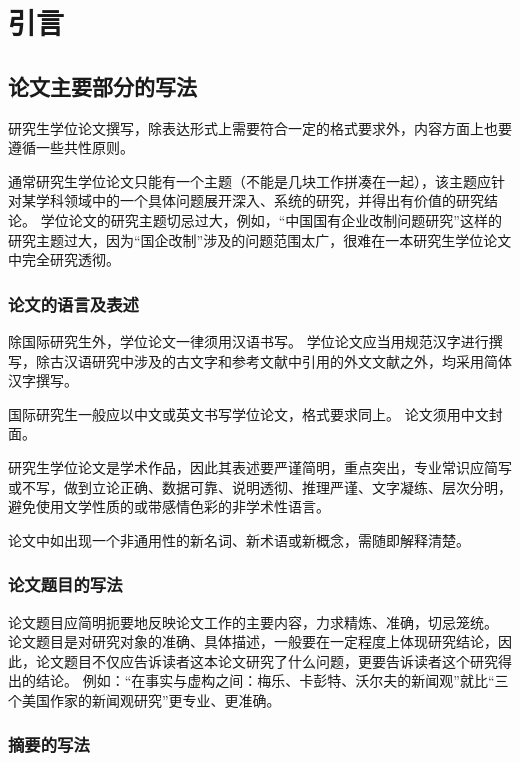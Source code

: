 \chapter{引言}
	\section{论文主要部分的写法}
	
	研究生学位论文撰写，除表达形式上需要符合一定的格式要求外，内容方面上也要遵循一些共性原则。
	
	通常研究生学位论文只能有一个主题（不能是几块工作拼凑在一起），该主题应针对某学科领域中的一个具体问题展开深入、系统的研究，并得出有价值的研究结论。
	学位论文的研究主题切忌过大，例如，“中国国有企业改制问题研究”这样的研究主题过大，因为“国企改制”涉及的问题范围太广，很难在一本研究生学位论文中完全研究透彻。
	
	
		
		\subsection{论文的语言及表述}
		
		除国际研究生外，学位论文一律须用汉语书写。
		学位论文应当用规范汉字进行撰写，除古汉语研究中涉及的古文字和参考文献中引用的外文文献之外，均采用简体汉字撰写。
		
		国际研究生一般应以中文或英文书写学位论文，格式要求同上。
		论文须用中文封面。
		
		研究生学位论文是学术作品，因此其表述要严谨简明，重点突出，专业常识应简写或不写，做到立论正确、数据可靠、说明透彻、推理严谨、文字凝练、层次分明，避免使用文学性质的或带感情色彩的非学术性语言。
		
		论文中如出现一个非通用性的新名词、新术语或新概念，需随即解释清楚。
		
		
		
		\subsection{论文题目的写法}
		
		论文题目应简明扼要地反映论文工作的主要内容，力求精炼、准确，切忌笼统。
		论文题目是对研究对象的准确、具体描述，一般要在一定程度上体现研究结论，因此，论文题目不仅应告诉读者这本论文研究了什么问题，更要告诉读者这个研究得出的结论。
		例如：“在事实与虚构之间：梅乐、卡彭特、沃尔夫的新闻观”就比“三个美国作家的新闻观研究”更专业、更准确。
		
		
		
		\subsection{摘要的写法}
		
